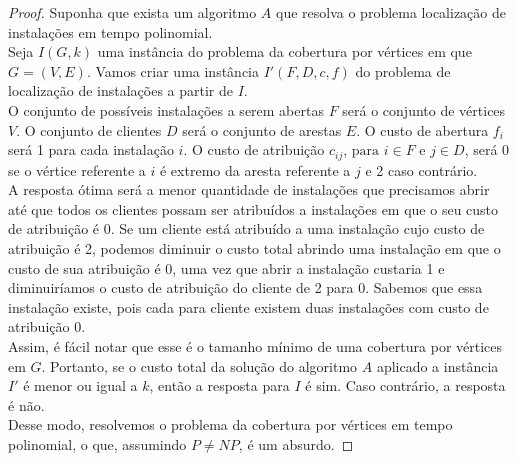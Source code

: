 \documentclass[12pt]{article}
\newcommand{\NP}{\mathit{NP}}
\begin{document}
\begin{proof}
    Suponha que exista um algoritmo $A$ que resolva o problema localização de instalações em tempo polinomial. \\
    Seja $I(G,k)$ uma instância do problema da cobertura por vértices em que $G = (V,E)$. Vamos criar uma instância $I'(F,D,c,f)$ do problema de localização de instalações a partir de $I$.\\
    O conjunto de possíveis instalações a serem abertas $F$ será o conjunto de vértices $V$. O conjunto de clientes $D$ será o conjunto de arestas $E$. O custo de abertura $f_i$ será 1 para cada instalação $i$. O custo de atribuição $c_{ij} \text{, para } i \in F \text{ e } j \in D$, será 0 se o vértice referente a $i$ é extremo da aresta referente a $j$ e 2 caso contrário. \\
    A resposta ótima será a menor quantidade de instalações que precisamos abrir até que todos os clientes possam ser atribuídos a instalações em que o seu custo de atribuição é 0. Se um cliente está atribuído a uma instalação cujo custo de atribuição é 2, podemos diminuir o custo total abrindo uma instalação em que o custo de sua atribuição é 0, uma vez que abrir a instalação custaria 1 e diminuiríamos o custo de atribuição do cliente de 2 para 0. Sabemos que essa instalação existe, pois cada para cliente existem duas instalações com custo de atribuição 0. \\
    Assim, é fácil notar que esse é o tamanho mínimo de uma cobertura por vértices em $G$. Portanto, se o custo total da solução do algoritmo $A$ aplicado a instância $I'$ é menor ou igual a $k$, então a resposta para $I$ é sim. Caso contrário, a resposta é não. \\
    Desse modo, resolvemos o problema da cobertura por vértices em tempo polinomial, o que, assumindo $P\not=\NP$, é um absurdo.
\end{proof}
\end{document}
